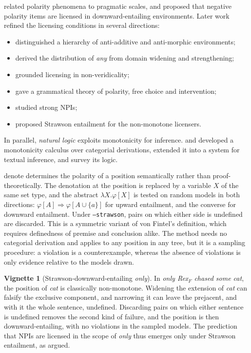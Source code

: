 \documentclass[11pt,a4paper]{article}
\newcommand{\dn}{\textsf{denote}}
\theoremstyle{definition}
\newtheorem{vignette}{Vignette}
\begin{document}
\citet{fauconnier1975} related polarity phenomena to pragmatic scales, and \citet{ladusaw1979} proposed that negative polarity items are licensed in downward-entailing environments. Later work refined the licensing conditions in several directions:
\begin{itemize}
\item \citet{zwarts1998} distinguished a hierarchy of anti-additive and anti-morphic environments;
\item \citet{kadmonlandman1993} derived the distribution of \textit{any} from domain widening and strengthening;
\item \citet{giannakidou1998} grounded licensing in non-veridicality;
\item \citet{chierchia2013} gave a grammatical theory of polarity, free choice and intervention;
\item \citet{gajewski2011} studied strong NPIs;
\item \citet{vonfintel1999} proposed Strawson entailment for the non-monotone licensers.
\end{itemize}
In parallel, \emph{natural logic} exploits monotonicity for inference. \citet{vanbenthem1986} and \citet{sanchezvalencia1991} developed a monotonicity calculus over categorial derivations, \citet{maccartneymanning2009} extended it into a system for textual inference, and \citet{icardmoss2014} survey its logic.

\dn{} determines the polarity of a position semantically rather than proof-theoretically. The denotation at the position is replaced by a variable $X$ of the same set type, and the abstract $\lambda X.\varphi[X]$ is tested on random models in both directions: $\varphi[A]\Rightarrow\varphi[A\cup\{a\}]$ for upward entailment, and the converse for downward entailment. Under \texttt{--strawson}, pairs on which either side is undefined are discarded. This is a symmetric variant of von Fintel's definition, which requires definedness of premise and conclusion alike. The method needs no categorial derivation and applies to any position in any tree, but it is a sampling procedure: a violation is a counterexample, whereas the absence of violations is only evidence relative to the models drawn.

\begin{vignette}[Strawson-downward-entailing \textit{only}]\label{v:strawson}
In \textit{only Rex$_F$ chased some cat}, the position of \textit{cat} is classically non-monotone. Widening the extension of \textit{cat} can falsify the exclusive component, and narrowing it can leave the prejacent, and with it the whole sentence, undefined. Discarding pairs on which either sentence is undefined removes the second kind of failure, and the position is then downward-entailing, with no violations in the sampled models. The prediction that NPIs are licensed in the scope of \textit{only} thus emerges only under Strawson entailment, as \citet{vonfintel1999} argued.
\end{vignette}
\end{document}
